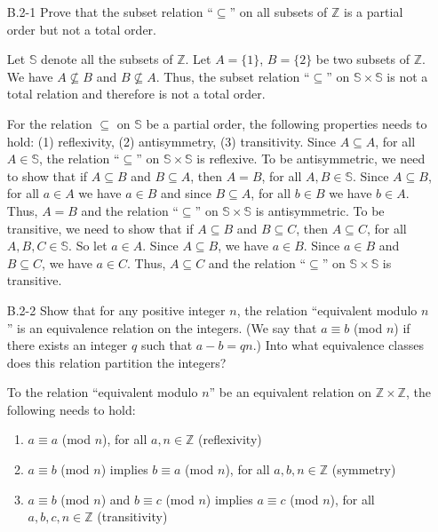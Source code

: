 \documentclass{report}
\makeatletter
\renewenvironment{framed}{%
 \def\FrameCommand##1{\hskip\@totalleftmargin
 \fboxsep=\FrameSep\fbox{##1}}%
 \MakeFramed {\advance\hsize-\width
   \@totalleftmargin\z@ \linewidth\hsize
   \@setminipage}}%
 {\par\unskip\endMakeFramed}
\makeatother
\begin{document}
\begin{enumerate}

\item[B.2{-}1]{Prove that the subset relation ``$\subseteq$'' on all subsets of
$\mathbb{Z}$ is a partial order but not a total order.}

\begin{framed}
Let $\mathbb{S}$ denote all the subsets of $\mathbb{Z}$. Let $A = \{1\}$,
$B = \{2\}$ be two subsets of $\mathbb{Z}$. We have $A \not\subseteq B$ and
$B \not\subseteq A$. Thus, the subset relation ``$\subseteq$'' on
$\mathbb{S} \times \mathbb{S}$ is not a total relation and therefore is not
a total order.

For the relation $\subseteq$ on $\mathbb{S}$ be a partial order, the
following properties needs to hold: (1) reflexivity, (2) antisymmetry,
(3) transitivity. Since $A \subseteq A$, for all $A \in \mathbb{S}$, the
relation ``$\subseteq$'' on $\mathbb{S} \times \mathbb{S}$ is reflexive. To be
antisymmetric, we need to show that if $A \subseteq B$ and $B \subseteq A$, then
$A = B$, for all $A, B \in \mathbb{S}$. Since $A \subseteq B$, for all $a \in A$
we have $a \in B$ and since $B \subseteq A$, for all $b \in B$ we have
$b \in A$.  Thus, $A = B$ and the relation ``$\subseteq$'' on
$\mathbb{S} \times \mathbb{S}$ is antisymmetric. To be transitive, we need to
show that if $A \subseteq B$ and $B \subseteq C$, then $A \subseteq C$, for all
$A, B, C \in \mathbb{S}$. So let $a \in A$.  Since $A \subseteq B$, we have
$a \in B$. Since $a \in B$ and $B \subseteq C$, we have $a \in C$. Thus,
$A \subseteq C$ and the relation ``$\subseteq$'' on
$\mathbb{S} \times \mathbb{S}$ is transitive.
\end{framed}

\item[B.2{-}2]{Show that for any positive integer $n$, the relation ``equivalent
modulo $n$'' is an equivalence relation on the integers. (We say that
$a \equiv b$ (mod $n$) if there exists an integer $q$ such that $a - b = qn$.)
Into what equivalence classes does this relation partition the integers?}

\begin{framed}
To the relation ``equivalent modulo $n$'' be an equivalent relation on
$\mathbb{Z} \times \mathbb{Z}$, the following needs to hold:
\begin{enumerate}
  \item $a \equiv a$ (mod $n$), for all $a, n \in \mathbb{Z}$ (reflexivity)
  \item $a \equiv b$ (mod $n$) implies $b \equiv a$ (mod $n$), for all $a, b, n \in \mathbb{Z}$ (symmetry)
  \item $a \equiv b$ (mod $n$) and $b \equiv c$ (mod $n$) implies $a \equiv c$ (mod $n$), for all $a, b, c, n \in \mathbb{Z}$ (transitivity)
\end{enumerate}


\end{framed}
\end{enumerate}
\end{document}
